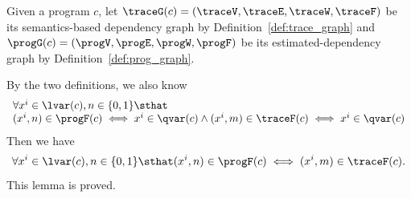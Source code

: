 \begin{subproof}
	Given a program ${c}$, let $\traceG({c}) = (\traceV, \traceE, \traceW, \traceF)$ 
	be its semantics-based dependency graph by Definition~\ref{def:trace_graph} and $\progG({c}) = (\progV, \progE, \progW, \progF)$ be its estimated-dependency graph
	by Definition~\ref{def:prog_graph}.
	
By the two definitions, we also know
\[
	\begin{array}{l}
		\forall  x^i \in \lvar(c), n \in \{0, 1\} \sthat
		\\
	(x^i, n) \in \progF(c) \iff x^i \in \qvar(c)
	\land 
	(x^i, m) \in \traceF(c) \iff x^i \in \qvar(c)
	\end{array}
\]
Then we have 
\[
	\forall  x^i \in \lvar(c), n \in \{0, 1\} \sthat
	(x^i, n) \in \progF(c) \iff 
	(x^i, m) \in \traceF(c).
	\]
 This lemma is proved.
\end{subproof}